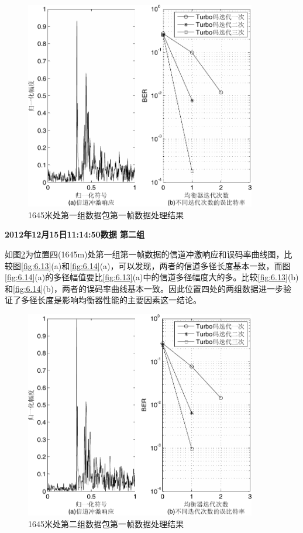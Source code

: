 \begin{figure}[htb]
  \begin{center}
    \includegraphics[width=0.9\textwidth]{images/result_4_1.pdf}
  \end{center}
  \caption{1645米处第一组数据包第一帧数据处理结果}
  \label{fig:6.15}
\end{figure}

\textbf{\sihao 2012年12月15日11:14:50数据 第二组} 

如图\ref{fig:6.16}为位置四(1645m)处第一组第一帧数据的信道冲激响应和误码率曲线图，比较图\ref{fig:6.13}(a)和\ref{fig:6.14}(a)，可以发现，两者的信道多径长度基本一致，而图\ref{fig:6.14}(a)的多径幅值要比\ref{fig:6.13}(a)中的信道多径幅度大的多。比较\ref{fig:6.13}(b)和\ref{fig:6.14}(b)，两者的误码率曲线基本一致。因此位置四处的两组数据进一步验证了多径长度是影响均衡器性能的主要因素这一结论。

\begin{figure}[htb]
  \begin{center}
    \includegraphics[width=0.9\textwidth]{images/result_4_2.pdf}
  \end{center}
  \caption{1645米处第二组数据包第一帧数据处理结果}
  \label{fig:6.16}
\end{figure}

